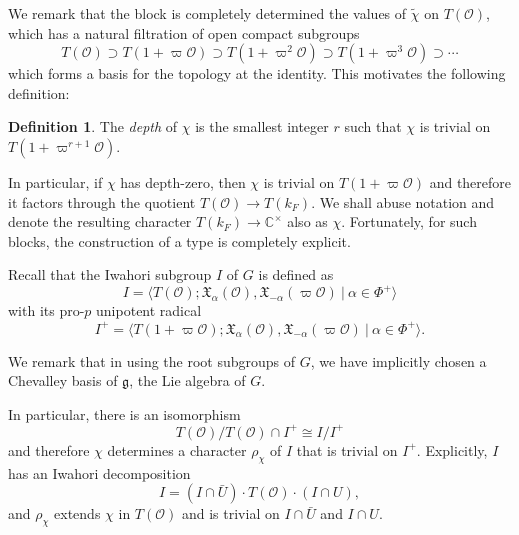\documentclass{article}
\newcommand{\cO}{\mathcal{O}}
\newcommand{\CC}{\mathbb{C}}
\newcommand{\RR}{\mathbb{R}}
\theoremstyle{plain}
\theoremstyle{definition}
\newtheorem{definition}[theorem]{Definition}
\begin{document}
    We remark that the block is completely determined the values of $\tilde\chi$ on $T(\cO)$, which has a natural filtration of open compact subgroups
    $$T(\cO)\supset T(1+\varpi\cO)\supset T(1+\varpi^2\cO)\supset T(1+\varpi^3\cO)\supset\cdots$$
    which forms a basis for the topology at the identity.
    This motivates the following definition:
    \begin{definition}
        The \textit{depth} of $\chi$ is the smallest integer $r$ such that $\chi$ is trivial on $T(1+\varpi^{r+1}\cO)$.
    \end{definition}
    In particular, if $\chi$ has depth-zero, then $\chi$ is trivial on $T(1+\varpi\cO)$ and therefore it factors through the quotient $T(\cO)\rightarrow T(k_F)$. We shall abuse notation and denote the resulting character $T(k_F)\rightarrow \CC^{\times}$ also as $\chi$. Fortunately, for such blocks, the construction of a type is completely explicit.

    Recall that the Iwahori subgroup $I$ of $G$ is defined as 
    $$I=\langle T(\mathcal{\mathcal{O}}); \mathfrak{X}_\alpha(\mathcal{O}),\mathfrak{X}_{-\alpha}(\varpi\mathcal{O})\ |\ \alpha\in\Phi^+\rangle$$
    with its pro-$p$ unipotent radical
    $$I^+=\langle T(1+\varpi\mathcal{\mathcal{O}}); \mathfrak{X}_\alpha(\mathcal{O}),\mathfrak{X}_{-\alpha}(\varpi\mathcal{O})\ |\ \alpha\in\Phi^+\rangle.$$

    We remark that in using the root subgroups of $G$, we have implicitly chosen a Chevalley basis of $\mathfrak{g}$, the Lie algebra of $G$.


    In particular, there is an isomorphism
    $$T(\cO)/T(\cO)\cap I^+\cong I/I^+$$
    and therefore $\chi$ determines a character $\rho_\chi$ of $I$ that is trivial on $I^+$. Explicitly, $I$ has an Iwahori decomposition $$I=(I\cap\bar U)\cdot T(\cO)\cdot(I\cap U),$$
    and $\rho_\chi$ extends $\chi$ in $T(\cO)$ and is trivial on $I\cap\bar U$ and $I\cap U$.
\end{document}
